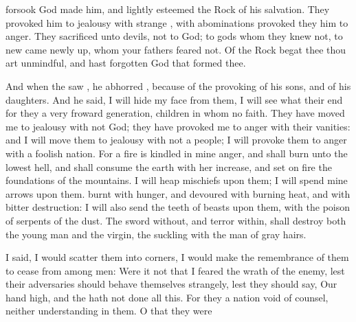 {forsook
God
{}
made him, and lightly
esteemed the
Rock of his
salvation.
They provoked him to
jealousy with
strange
{}, with
abominations provoked they him to
anger.
They
sacrificed unto
devils, not to
God; to
gods whom they
knew not, to
new
{}
came
newly
up, whom your
fathers
feared not.
Of the
Rock
{}
begat thee thou art
unmindful, and hast
forgotten
God that
formed thee.
\par }{\PP {}And when the
{}
saw
{}, he
abhorred
{}, because of the
provoking of his
sons, and of his
daughters.
And he
said, I will
hide my
face from them, I will
see what their
end
{} for they
{} a very
froward
generation,
children in whom
{} no
faith.
They have moved me to
jealousy with
{}
not
God; they have provoked me to
anger with their
vanities: and I will move them to
jealousy with
{} not a
people; I will provoke them to
anger with a
foolish
nation.
For a
fire is
kindled in mine
anger, and shall
burn unto the
lowest
hell, and shall
consume the
earth with her
increase, and set on
fire the
foundations of the
mountains.
I will
heap
mischiefs upon them; I will
spend mine
arrows upon them.
burnt with
hunger, and
devoured with burning
heat, and with
bitter
destruction: I will also
send the
teeth of
beasts upon them, with the
poison of
serpents of the
dust.
The
sword
without, and
terror
within, shall
destroy both the young
man and the
virgin, the
suckling
{} with the
man of gray
hairs.
\par }{\PP {}I
said, I would scatter them into
corners, I would make the
remembrance of them to
cease from among
men:
Were it
not that I
feared the
wrath of the
enemy, lest their
adversaries should behave themselves
strangely,
{} lest they should
say, Our
hand
{}
high, and the
{} hath not
done all this.
For they
{} a
nation
void of
counsel, neither
{}
understanding in them.
O
that they were
}
